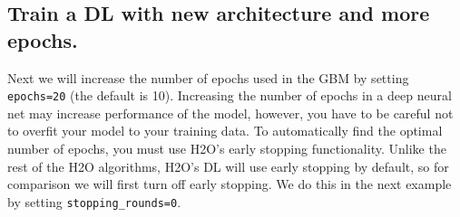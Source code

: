 \documentclass[]{book}
\newenvironment{Shaded}{\begin{snugshade}}{\end{snugshade}}
\newcommand{\DecValTok}[1]{\textcolor[rgb]{0.00,0.00,0.81}{#1}}
\newcommand{\ErrorTok}[1]{\textcolor[rgb]{0.64,0.00,0.00}{\textbf{#1}}}
\newcommand{\NormalTok}[1]{#1}
\newcommand{\OperatorTok}[1]{\textcolor[rgb]{0.81,0.36,0.00}{\textbf{#1}}}
\newcommand{\StringTok}[1]{\textcolor[rgb]{0.31,0.60,0.02}{#1}}
\begin{document}
\begin{Shaded}
\begin{Highlighting}[]
{{{{{{{{  \OperatorTok{|}\StringTok{                                                                       }
\StringTok{  }\ErrorTok{|======================================}\StringTok{                           }\ErrorTok{|}\StringTok{  }\DecValTok{58}\NormalTok{%}
  \OperatorTok{|}\StringTok{                                                                       }
\StringTok{  }\ErrorTok{|==========================================}\StringTok{                       }\ErrorTok{|}\StringTok{  }\DecValTok{65}\NormalTok{%}
  \OperatorTok{|}\StringTok{                                                                       }
\StringTok{  }\ErrorTok{|===============================================}\StringTok{                  }\ErrorTok{|}\StringTok{  }\DecValTok{72}\NormalTok{%}
  \OperatorTok{|}\StringTok{                                                                       }
\StringTok{  }\ErrorTok{|====================================================}\StringTok{             }\ErrorTok{|}\StringTok{  }\DecValTok{79}\NormalTok{%}
  \OperatorTok{|}\StringTok{                                                                       }
\StringTok{  }\ErrorTok{|========================================================}\StringTok{         }\ErrorTok{|}\StringTok{  }\DecValTok{87}\NormalTok{%}
  \OperatorTok{|}\StringTok{                                                                       }
\StringTok{  }\ErrorTok{|=============================================================}\StringTok{    }\ErrorTok{|}\StringTok{  }\DecValTok{94}\NormalTok{%}
  \OperatorTok{|}\StringTok{                                                                       }
\StringTok{  }\ErrorTok{|=================================================================|}\StringTok{ }\DecValTok{100}\NormalTok{%}
\end{Highlighting}
\end{Shaded}

\hypertarget{train-a-dl-with-new-architecture-and-more-epochs.}{%
\subsection{Train a DL with new architecture and more epochs.}\label{train-a-dl-with-new-architecture-and-more-epochs.}}

Next we will increase the number of epochs used in the GBM by setting \texttt{epochs=20} (the default is 10).
Increasing the number of epochs in a deep neural net may increase performance of the model, however, you have to be careful not to overfit your model to your training data. To automatically find the optimal number of epochs, you must use H2O's early stopping functionality. Unlike the rest of the H2O algorithms, H2O's DL will use early stopping by default, so for comparison we will first turn off early stopping. We do this in the next example by setting \texttt{stopping\_rounds=0}.
\end{document}
